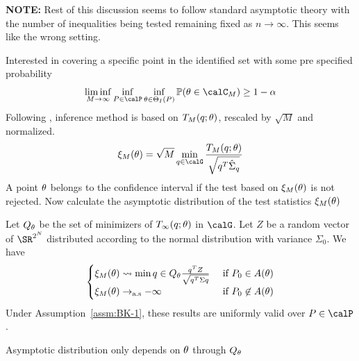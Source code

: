 \textbf{NOTE:} Rest of this discussion seems to follow standard asymptotic theory with the number of inequalities being tested remaining fixed as $n\rightarrow\infty$. This seems like the wrong setting.

Interested in covering a specific point in the identified set with some pre specified probability 
\[\liminf_{M\to\infty} \inf_{P\in\calP}\inf_{\theta\in\Theta_I(P)} \P(\t\in\calC_M) \geq 1 - \alpha\]
Following \citet{BMM-2012}, inference method is based on $T_M(q;\theta)$, rescaled by $\sqrt{M}$ and normalized. 
\[\xi_M(\t) = \sqrt{M} \min_{q\in\calG} \frac{T_M(q;\t)}{\sqrt{q^T \hat{\Sigma}_q}}\]
A point $\theta$ belongs to the confidence interval if the test based on $\xi_M(\theta)$ is not rejected. Now calculate the asymptotic distribution of the test statistics $\xi_M(\theta)$ 
\begin{prop}
	\label{prop:BK-9}
	Let $Q_\theta$ be the set of minimizers of $T_\infty(q;\theta)$ in $\calG$. Let $Z$ be a random vector of $\SR^{2^N}$ distributed according to the normal distribution with variance $\Sigma_0$. We have 
	\begin{equation*}
		\begin{cases}
			\xi_M(\theta) \rightsquigarrow \min{q \in Q_\theta} \frac{q^T Z}{\sqrt{q^T\Sigma q}} &\text{ if } P_0 \in A(\theta)\\
			\xi_M(\theta) \rightarrow_{\text{a.s}} -\infty &\text{ if }P_0\not\in A(\theta)
		\end{cases}
	\end{equation*}
	Under Assumption~\ref{assm:BK-1}, these results are uniformly valid over $P\in\calP$.
\end{prop}
Asymptotic distribution only depends on $\theta$ through $Q_\theta$



























